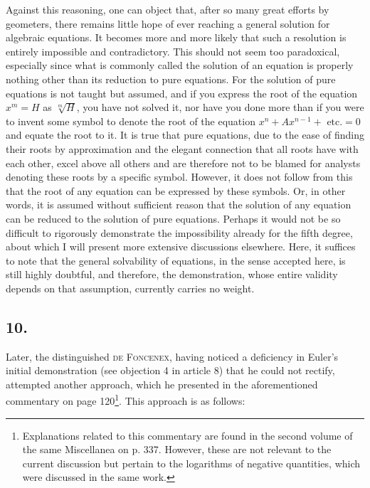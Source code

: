 \documentclass[12pt]{memoir}
\theoremstyle{plain}
\theoremstyle{remark}
\begin{document}
Against this reasoning, one can object that, after so many great efforts by geometers, there remains little hope of ever reaching a general solution for algebraic equations. It becomes more and more likely that such a resolution is entirely impossible and contradictory. This should not seem too paradoxical, especially since what is commonly called the solution of an equation is properly nothing other than its reduction to pure equations. For the solution of pure equations is not taught but assumed, and if you express the root of the equation \(x^m = H\) as \(\sqrt[m]{H}\), you have not solved it, nor have you done more than if you were to invent some symbol to denote the root of the equation \(x^n + Ax^{n-1}+ \text{ etc.} = 0\) and equate the root to it. It is true that pure equations, due to the ease of finding their roots by approximation and the elegant connection that all roots have with each other, excel above all others and are therefore not to be blamed for analysts denoting these roots by a specific symbol. However, it does not follow from this that the root of any equation can be expressed by these symbols. Or, in other words, it is assumed without sufficient reason that the solution of any equation can be reduced to the solution of pure equations. Perhaps it would not be so difficult to rigorously demonstrate the impossibility already for the fifth degree, about which I will present more extensive discussions elsewhere. Here, it suffices to note that the general solvability of equations, in the sense accepted here, is still highly doubtful, and therefore, the demonstration, whose entire validity depends on that assumption, currently carries no weight.

\subsection*{10.}

Later, the distinguished \textsc{de Foncenex}, having noticed a deficiency in Euler's initial demonstration (see objection 4 in article 8) that he could not rectify, attempted another approach, which he presented in the aforementioned commentary on page 120\footnote{Explanations related to this commentary are found in the second volume of the same Miscellanea on p. 337. However, these are not relevant to the current discussion but pertain to the logarithms of negative quantities, which were discussed in the same work.}. This approach is as follows:
\end{document}
